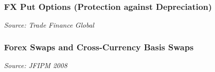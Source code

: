 \documentclass{beamer}
\begin{document}
\begin{frame}
  \frametitle{FX Put Options (Protection against Depreciation)}
  \emph{Source: Trade Finance Global \href{https://www.tradefinanceglobal.com/currency/foreign-exchange-options/)}{}}
\end{frame}


\begin{frame}
\frametitle{Forex Swaps and Cross-Currency Basis Swaps}
\medskip
\emph{Source: JFIPM 2008 \href{https://jfi.pm-research.com/content/18/4/24)}{}}
\end{frame}
\end{document}
